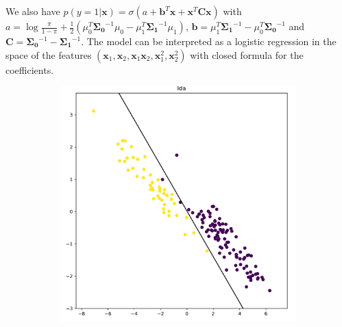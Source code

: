 \documentclass[9pt, oneside]{amsart}   	%
\begin{document}
We also have $\boxed{p(y=1|\mathbf{x}) = \sigma\left(a + \mathbf{b}^T\mathbf{x} + \mathbf{x}^T\mathbf{C}\mathbf{x}\right)}$ with $a= \log\frac{\pi}{1-\pi} + \frac{1}{2}(\mu_0^T\bm{\Sigma_0}^{-1}\mu_0 -\mu_1^T\bm{\Sigma_1}^{-1}\mu_1)$, $\mathbf{b}=\mu_1^T\bm{\Sigma_1}^{-1} - \mu_0^T\bm{\Sigma_0}^{-1}$ and $\mathbf{C} = \bm{\Sigma_0}^{-1} - \bm{\Sigma_1}^{-1}$. The model can be interpreted as a logistic regression in the space of the features $(\mathbf{x}_1, \mathbf{x}_2, \mathbf{x}_1\mathbf{x}_2, \mathbf{x}_1^2, \mathbf{x}_2^2)$ with closed formula for the coefficients.

\clearpage
\begin{figure}[t!]
\centering
\begin{subfigure}{.45\textwidth}
  \centering
  \includegraphics[width=\linewidth]{classificationA_lda.pdf}
\end{subfigure} \hspace{5pt}
\begin{subfigure}{.45\textwidth}
  \centering

\end{subfigure}
\end{figure}
\end{document}
